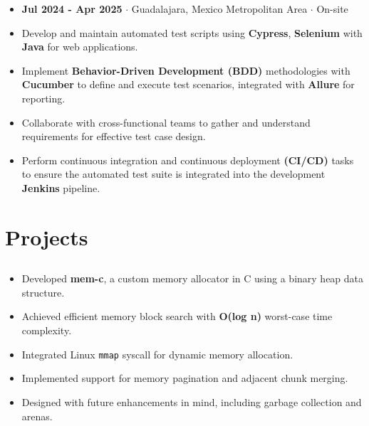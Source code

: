 \documentclass[11pt]{article}
\begin{document}
\begin{itemize}[noitemsep, nolistsep]
\item \textbf{Jul 2024 - Apr 2025} $\cdot$ Guadalajara, Mexico Metropolitan Area $\cdot$ On-site
\item Develop and maintain automated test scripts using \textbf{Cypress}, \textbf{Selenium} with \textbf{Java} for web applications.
\item Implement \textbf{Behavior-Driven Development (BDD)} methodologies with \textbf{Cucumber} to define
  and execute test scenarios, integrated with \textbf{Allure} for reporting.
\item Collaborate with cross-functional teams to gather and understand requirements for effective test case
  design.
\item Perform continuous integration and continuous deployment \textbf{(CI/CD)} tasks to ensure
  the automated test suite is integrated into the development \textbf{Jenkins} pipeline.
\end{itemize}
\vspace{-0.7cm}

\section*{Projects}
\vspace{-0.4cm}
\titlerule[0.3pt]
\vspace{0.1cm}

\subsection*{\href{https://github.com/alecksandr26/mem-c}{\color{blue}{Memory Allocator in C:}}}
\vspace{-0.3cm}
\begin{itemize}[noitemsep, nolistsep]
\item Developed \textbf{mem-c}, a custom memory allocator in C using a binary heap data structure.
\item Achieved efficient memory block search with \textbf{O(log n)} worst-case time complexity.
\item Integrated Linux \texttt{mmap} syscall for dynamic memory allocation.
\item Implemented support for memory pagination and adjacent chunk merging.
\item Designed with future enhancements in mind, including garbage collection and arenas.
\end{itemize}
\end{document}
